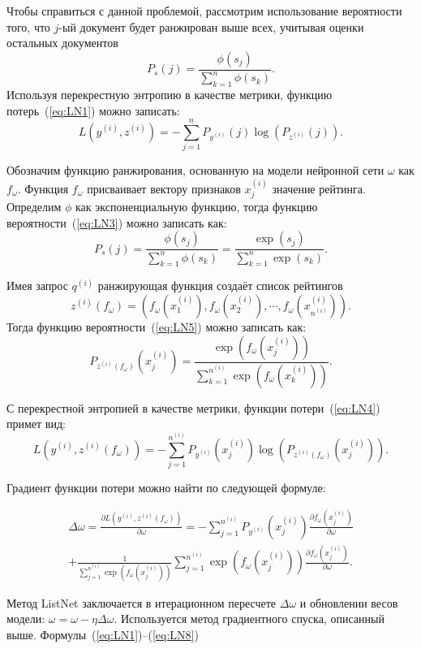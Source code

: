 Чтобы справиться с данной проблемой, рассмотрим использование вероятности того, что $j$-ый документ будет ранжирован выше всех, учитывая оценки остальных документов
\begin{equation}
	\label{eq:LN3}
	P_s(j)=\frac{\phi(s_j)}{\sum_{k=1}^n \phi(s_k)} .
\end{equation}
Используя перекрестную энтропию в качестве метрики, функцию потерь~(\ref{eq:LN1}) можно записать:
\begin{equation}
	\label{eq:LN4}
	L(y^{(i)}, z^{(i)})=-\sum_{j=1}^n P_{y^{(i)}}(j) \log (P_{z^{(i)}}(j)).
\end{equation}

Обозначим функцию ранжирования, основанную на модели нейронной сети $\omega$ как $f_\omega$. Функция $f_\omega$ присваивает вектору признаков $x_j^{(i)}$ значение рейтинга. Определим $\phi$ как экспоненциальную функцию, тогда функцию вероятности~(\ref{eq:LN3}) можно записать как:
\begin{equation}
	\label{eq:LN5}
	P_s(j)=\frac{\phi(s_j)}{\sum_{k=1}^n \phi(s_k)}=\frac{\exp (s_j)}{\sum_{k=1}^n \exp (s_k)}.
\end{equation}

Имея запрос $q^{(i)}$ ранжирующая функция создаёт список рейтингов \[z^{(i)}(f_\omega)=(f_\omega(x_1^{(i)}), f_\omega(x_2^{(i)}), \cdots, f_\omega(x_{n^{(i)}}^{(i)})).
\]
Тогда функцию вероятности~(\ref{eq:LN5}) можно записать как:
\begin{equation}
	\label{eq:LN6}
	P_{z^{(i)}(f_\omega)}(x_j^{(i)})=\frac{\exp (f_\omega(x_j^{(i)}))}{\sum_{k=1}^{n^{(i)}} \exp (f_\omega(x_k^{(i)}))}.
\end{equation}

С перекрестной энтропией в качестве метрики, функции потери~(\ref{eq:LN4}) примет вид:
\begin{equation}
	\label{eq:LN7}
	L(y^{(i)}, z^{(i)}(f_\omega))=-\sum_{j=1}^{n^{(i)}} P_{y^{(i)}}(x_j^{(i)}) \log (P_{z^{(i)}(f_\omega)}(x_j^{(i)})).
\end{equation}

Градиент функции потери можно найти по следующей формуле:

\begin{equation}
	\label{eq:LN8}
	\begin{aligned}
		\Delta \omega= 
		\frac{\partial L(y^{(i)}, z^{(i)}(f_\omega))}{\partial \omega}=-\sum_{j=1}^{n^{(i)}} P_{y^{(i)}}(x_j^{(i)}) \frac{\partial f_\omega(x_j^{(i)})}{\partial \omega} \\
		+\frac{1}{\sum_{j=1}^{n^{(i)}} \exp (f_\omega(x_j^{(i)}))} \sum_{j=1}^{n^{(i)}} \exp (f_\omega(x_j^{(i)})) \frac{\partial f_\omega(x_j^{(i)})}{\partial \omega}.
	\end{aligned}
\end{equation}


Метод ListNet заключается в итерационном пересчете $\Delta \omega$ и обновлении весов модели: $\omega = \omega - \eta\Delta \omega$. Используется метод градиентного спуска, описанный выше. Формулы~(\ref{eq:LN1})--(\ref{eq:LN8})~\cite{ListNet}